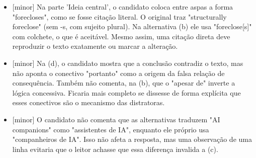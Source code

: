 \documentclass{article}%
\begin{document}
\begin{itemize}%
\item%
{[}minor{]} Na parte 'Ideia central', o candidato coloca entre aspas a forma "forecloses", como se fosse citação literal. O original traz "structurally foreclose" (sem {-}s, com sujeito plural). Na alternativa (b) ele usa "foreclose{[}s{]}" com colchete, o que é aceitável. Mesmo assim, uma citação direta deve reproduzir o texto exatamente ou marcar a alteração.%
\item%
{[}minor{]} Na (d), o candidato mostra que a conclusão contradiz o texto, mas não aponta o conectivo "portanto" como a origem da falsa relação de consequência. Também não comenta, na (b), que o "apesar de" inverte a lógica concessiva. Ficaria mais completo se dissesse de forma explícita que esses conectivos são o mecanismo das distratoras.%
\item%
{[}minor{]} O candidato não comenta que as alternativas traduzem "AI companions" como "assistentes de IA", enquanto ele próprio usa "companheiros de IA". Isso não afeta a resposta, mas uma observação de uma linha evitaria que o leitor achasse que essa diferença invalida a (c).%
\end{itemize}%
\end{document}
